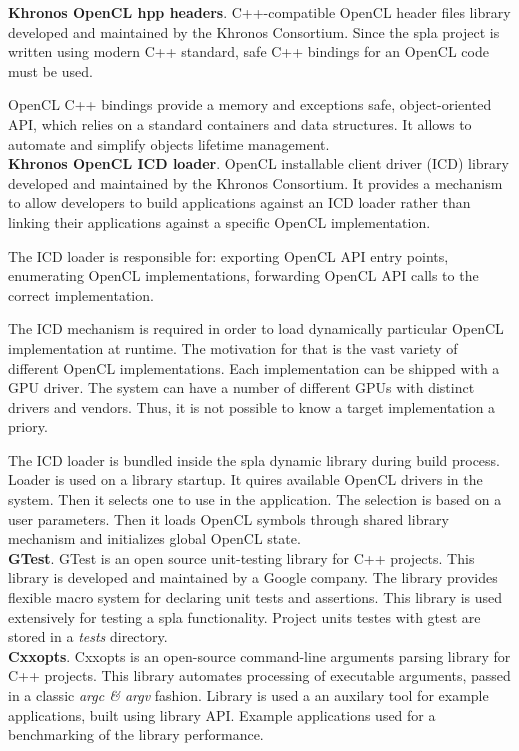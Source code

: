 \textbf{Khronos OpenCL hpp headers}. C++-compatible OpenCL header files library developed and maintained by the Khronos Consortium. Since the spla project is written using modern C++ standard, safe C++ bindings for an OpenCL code must be used. 

OpenCL C++ bindings provide a memory and exceptions safe, object-oriented API, which relies on a standard containers and data structures. It allows to automate and simplify objects lifetime management. \\

\textbf{Khronos OpenCL ICD loader}. OpenCL installable client driver (ICD) library developed and maintained by the Khronos Consortium. It provides a mechanism to allow developers to build applications against an ICD loader rather than linking their applications against a specific OpenCL implementation. 

The ICD loader is responsible for: exporting OpenCL API entry points, enumerating OpenCL implementations, forwarding OpenCL API calls to the correct implementation.

The ICD mechanism is required in order to load dynamically particular OpenCL implementation at runtime. The motivation for that is the vast variety of different OpenCL implementations. Each implementation can be shipped with a GPU driver. The system can have a number of different GPUs with distinct drivers and vendors. Thus, it is not possible to know a target implementation a priory.

The ICD loader is bundled inside the spla dynamic library during build process. Loader is used on a library startup. It quires available OpenCL drivers in the system. Then it selects one to use in the application. The selection is based on a user parameters. Then it loads OpenCL symbols through shared library mechanism and initializes global OpenCL state.\\

\textbf{GTest}. GTest is an open source unit-testing library for C++ projects. This library is developed and maintained by a Google company. The library provides flexible macro system for declaring unit tests and assertions. This library is used extensively for testing a spla functionality. Project units testes with gtest are stored in a \textit{tests} directory.\\

\textbf{Cxxopts}. Cxxopts is an open-source command-line arguments parsing library for C++ projects. This library automates processing of executable arguments, passed in a classic \textit{argc \& argv} fashion. Library is used a an auxilary tool for example applications, built using library API. Example applications used for a benchmarking of the library performance.\\

